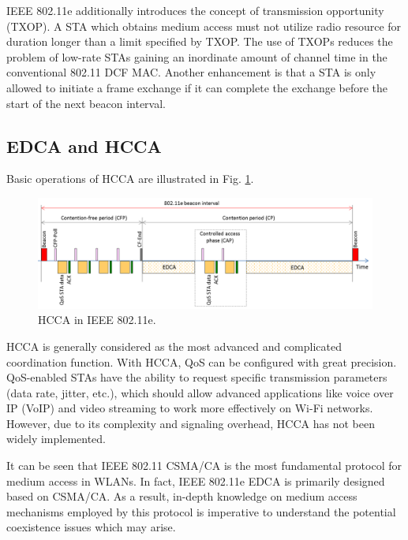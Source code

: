 IEEE 802.11e additionally introduces the concept of transmission opportunity (TXOP). A STA which obtains medium access must not utilize radio resource for duration longer than a limit specified by TXOP. The use of TXOPs reduces the problem of low-rate STAs gaining an inordinate amount of channel time in the conventional 802.11 DCF MAC. Another enhancement is that a STA is only allowed to initiate a frame exchange if it can complete the exchange before the start of the next beacon interval.

\subsection{EDCA and HCCA}
\label{edca-hcca}

Basic operations of HCCA are illustrated in Fig. \ref{figs:802-11e-HCCA}. 
\begin{figure}[!ht]
	\centering
	\includegraphics[width=1.0\columnwidth]{figs/802-11e-HCCA}
	\caption{HCCA in IEEE 802.11e.}
	\label{figs:802-11e-HCCA}
\end{figure}
HCCA is generally considered as the most advanced and complicated coordination function. With HCCA, QoS can be configured with great precision. QoS-enabled STAs have the ability to request specific transmission parameters (data rate, jitter, etc.), which should allow advanced applications like voice over IP (VoIP) and video streaming to work more effectively on \mbox{Wi-Fi} networks. However, due to its complexity and signaling overhead, HCCA has not been widely implemented.

It can be seen that IEEE 802.11 CSMA/CA is the most fundamental protocol for medium access in WLANs. In fact, IEEE 802.11e EDCA is primarily designed based on CSMA/CA. As a result, in-depth knowledge on medium access mechanisms employed by this protocol is imperative to understand the potential coexistence issues which may arise.



